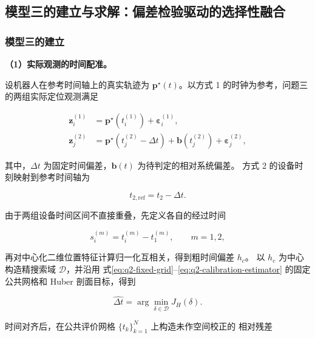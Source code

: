 \subsection{模型三的建立与求解：偏差检验驱动的选择性融合}\label{sec:model-q3}

\subsubsection{模型三的建立}\label{sec:q3-establishment}

\noindent\textbf{（1）实际观测的时间配准。}

设机器人在参考时间轴上的真实轨迹为 \(\mathbf p^\star(t)\)。以方式 1
的时钟为参考，问题三的两组实际定位观测满足

\begin{equation}
\begin{aligned}
\mathbf z_i^{(1)}
&=\mathbf p^\star\!\left(t_i^{(1)}\right)
+\boldsymbol\varepsilon_i^{(1)},\\
\mathbf z_j^{(2)}
&=\mathbf p^\star\!\left(t_j^{(2)}-\Delta t\right)
+\mathbf b(t_j^{(2)})
+\boldsymbol\varepsilon_j^{(2)},
\end{aligned}
\label{eq:q3-observation}
\end{equation}

其中，\(\Delta t\) 为固定时间偏差，\(\mathbf b(t)\) 为待判定的相对系统偏差。
方式 2 的设备时刻映射到参考时间轴为

\begin{equation}
t_{2,\mathrm{ref}}=t_2-\Delta t.
\label{eq:q3-time-map}
\end{equation}

由于两组设备时间区间不直接重叠，先定义各自的经过时间

\begin{equation}
s_i^{(m)}=t_i^{(m)}-t_1^{(m)},\qquad m=1,2,
\label{eq:q3-elapsed-time}
\end{equation}

再对中心化二维位置特征计算归一化互相关，得到粗时间偏差 \(h_c\)。
以 \(h_c\) 为中心构造精搜索域 \(\mathcal D\)，并沿用
式\eqref{eq:q2-fixed-grid}--\eqref{eq:q2-calibration-estimator}
的固定公共网格和 Huber 剖面目标，得到

\begin{equation}
\widehat{\Delta t}
=\arg\min_{\delta\in\mathcal D}J_H(\delta).
\label{eq:q3-time-estimator}
\end{equation}

时间对齐后，在公共评价网格 \(\{t_k\}_{k=1}^{N}\) 上构造未作空间校正的
相对残差

